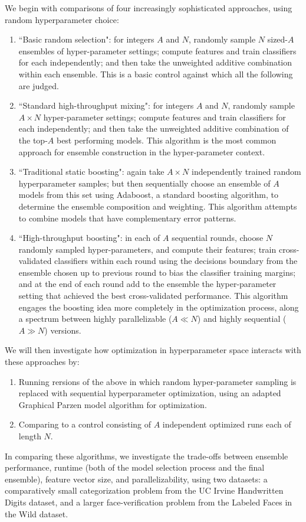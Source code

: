 \documentclass[11pt,twocolumn]{article}
\begin{document}
We begin with comparisons of four increasingly sophisticated approaches, using random hyperparameter choice: 
\begin{enumerate}
\item ``Basic random selection":  for integers $A$ and $N$, randomly sample $N$ sized-$A$ ensembles of hyper-parameter settings; compute features and train classifiers for each independently; and then take the unweighted additive combination within each ensemble.  This is a basic control against which all the following are judged. 
\item ``Standard high-throughput mixing":  for integers $A$ and $N$, randomly sample $A \times N$ hyper-parameter settings; compute features and train classifiers for each independently; and then take the unweighted additive combination of the top-$A$ best performing models.  This algorithm is the most common approach for ensemble construction in the hyper-parameter context. 
\item ``Traditional static boosting":  again take $A \times N$ independently trained random hyperparameter samples; but then sequentially choose an ensemble of $A$ models from this set using Adaboost, a standard boosting algorithm, to determine the ensemble composition and weighting.   This algorithm attempts to combine models that have complementary error patterns.  
\item ``High-throughput boosting":  in each of $A$ sequential rounds, choose $N$ randomly sampled hyper-parameters, and compute their features; train cross-validated classifiers within each round using the decisions boundary from the ensemble chosen up to previous round to bias the classifier training margins; and at the end of each round add to the ensemble the hyper-parameter setting that achieved the best cross-validated performance.   This algorithm engages the boosting idea more completely in the optimization process, along a spectrum between highly parallelizable ($A \ll N$) and highly sequential ($A \gg N$) versions.
\end{enumerate}

We will then investigate how optimization in hyperparameter space interacts with these approaches by:
\begin{enumerate}
\item Running rersions of the above in which random hyper-parameter sampling is replaced with sequential hyperparameter optimization, using an adapted Graphical Parzen model algorithm for optimization.   
\item Comparing to a control consisting of $A$ independent optimized runs each of length $N$.
\end{enumerate}

In comparing these algorithms, we investigate the trade-offs between ensemble performance, runtime (both of the model selection process and the final ensemble), feature vector size, and parallelizability, using two datasets:  a comparatively small categorization problem from the UC Irvine Handwritten Digits dataset, and a larger face-verification problem from the Labeled Faces in the Wild dataset. 


\small


\end{document}
